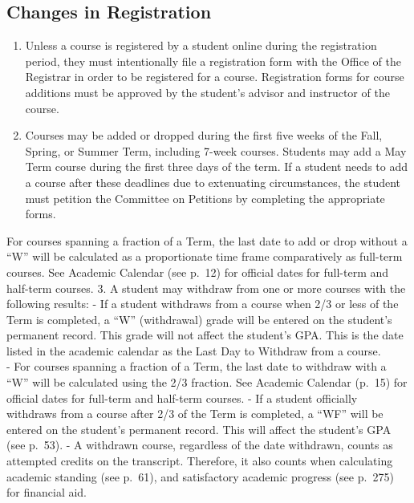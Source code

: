 \documentclass[
  letterpaper,
]{scrbook}
\providecommand{\tightlist}{%
  \setlength{\itemsep}{0pt}\setlength{\parskip}{0pt}}
\begin{document}
\hypertarget{changes-in-registration}{%
\subsection{Changes in Registration}\label{changes-in-registration}}

\begin{enumerate}
\def\labelenumi{\arabic{enumi}.}
\tightlist
\item
  Unless a course is registered by a student online during the
  registration period, they must intentionally file a registration form
  with the Office of the Registrar in order to be registered for a
  course. Registration forms for course additions must be approved by
  the student's advisor and instructor of the course.
\item
  Courses may be added or dropped during the first five weeks of the
  Fall, Spring, or Summer Term, including 7-week courses. Students may
  add a May Term course during the first three days of the term. If a
  student needs to add a course after these deadlines due to extenuating
  circumstances, the student must petition the Committee on Petitions by
  completing the appropriate forms.
\end{enumerate}

For courses spanning a fraction of a Term, the last date to add or drop
without a ``W'' will be calculated as a proportionate time frame
comparatively as full-term courses. See Academic Calendar (see p.~12)
for official dates for full-term and half-term courses. 3. A student may
withdraw from one or more courses with the following results: - If a
student withdraws from a course when 2/3 or less of the Term is
completed, a ``W'' (withdrawal) grade will be entered on the student's
permanent record. This grade will not affect the student's GPA. This is
the date listed in the academic calendar as the Last Day to Withdraw
from a course.\\
- For courses spanning a fraction of a Term, the last date to withdraw
with a ``W'' will be calculated using the 2/3 fraction. See Academic
Calendar (p.~15) for official dates for full-term and half-term courses.
- If a student officially withdraws from a course after 2/3 of the Term
is completed, a ``WF'' will be entered on the student's permanent
record. This will affect the student's GPA (see p.~53). - A withdrawn
course, regardless of the date withdrawn, counts as attempted credits on
the transcript. Therefore, it also counts when calculating academic
standing (see p.~61), and satisfactory academic progress (see p.~275)
for financial aid.
\end{document}
